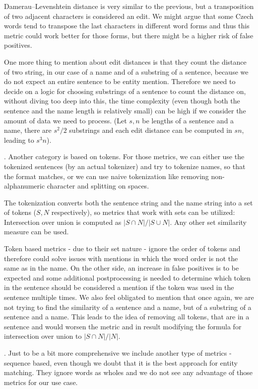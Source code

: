 Damerau–Levenshtein distance is very similar to the previous, but a transposition of two adjacent characters is considered an edit. We might argue that some Czech words tend to transpose the last characters in different word forms and thus this metric could work better for those forms, but there might be a higher risk of false positives.

One more thing to mention about edit distances is that they count the distance of two string, in our case of a name and of a substring of a sentence, because we do not expect an entire sentence to be entity mention. Therefore we need to decide on a logic for choosing substrings of a sentence to count the distance on, without diving too deep into this, the time complexity (even though both the sentence and the name length is relatively small) can be high if we consider the amount of data we need to process. (Let $s, n$ be lengths of a sentence and a name, there are $s^2/2$ substrings and each edit distance can be computed in $sn$, leading to $s^3n$). 

. Another category is based on tokens. For those metrics, we can either use the tokenized sentences (by an actual tokenizer) and try to tokenize names, so that the format matches, or we can use naive tokenization like removing non-alphanumeric character and splitting on spaces.

The tokenization converts both the sentence string and the name string into a set of tokens ($S, N$ respectively), so metrics that work with sets can be utilized: Intersection over union is computed as $|S \cap N| / |S \cup N|$. Any other set similarity measure can be used. 

Token based metrics - due to their set nature - ignore the order of tokens and therefore could solve issues with mentions in which the word order is not the same as in the name. On the other side, an increase in false positives is to be expected and some additional postprocessing is needed to determine which token in the sentence should be considered a mention if the token was used in the sentence multiple times. We also feel obligated to mention that once again, we are not trying to find the similarity of a sentence and a name, but of a substring of a sentence and a name. This leads to the idea of removing all tokens, that are in a sentence and would worsen the metric and in result modifying the formula for intersection over union to  $|S \cap N| / |N|$.


. Just to be a bit more comprehensive we include another type of metrics - sequence based, even though we doubt that it is the best approach for entity matching. They ignore words as wholes and we do not see any advantage of those metrics for our use case. 

